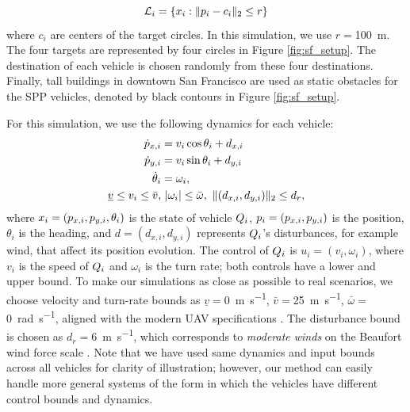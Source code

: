 \begin{equation}
\label{eq:target_sim}
\targetset_i = \{\state_i: \|\pos_i - c_i\|_2 \le r\}
\end{equation}
\noindent where $c_i$ are centers of the target circles. In this simulation, we use $r = $\SI{100}{\m}. The four targets are represented by four circles in Figure \ref{fig:sf_setup}. The destination of each vehicle is chosen randomly from these four destinations. Finally, tall buildings in downtown San Francisco are used as static obstacles for the SPP vehicles, denoted by black contours in Figure \ref{fig:sf_setup}.

For this simulation, we use the following dynamics for each vehicle:
\begin{equation}
\label{eq:dyn_i}
\begin{aligned}
\dot{\pos}_{x,i} &= v_i \cos \theta_i + d_{x,i} \\
\dot{\pos}_{y,i} &= v_i \sin \theta_i + d_{y,i}\\
\dot{\theta}_i &= \omega_i, \\
\underline{v} \le v_i \le \bar{v}, & ~|\omega_i| \le \bar{\omega}, ~\|(d_{x,i}, d_{y,i}) \|_2 \le d_{r},
\end{aligned}
\end{equation}
\noindent where $x_i = (p_{x,i}, p_{y,i}, \theta_i)$ is the state of vehicle $Q_i$, $p_i = (p_{x,i}, p_{y,i})$ is the position, $\theta_i$ is the heading, and $d = (d_{x,i}, d_{y,i})$ represents $Q_i$'s disturbances, for example wind, that affect its position evolution. The control of $Q_i$ is $u_i = (v_i, \omega_i)$, where $v_i$ is the speed of $Q_i$ and $\omega_i$ is the turn rate; both controls have a lower and upper bound. To make our simulations as close as possible to real scenarios, we choose velocity and turn-rate bounds as $\underline{v} = $\SI{0}{\m\per\s}, $\bar{v} = $\SI{25}{\m\per\s}, $\bar\omega = $\SI{0}{\radian\per\s}, aligned with the modern UAV specifications \cite{UAVspecs1, UAVspecs2}. The disturbance bound is chosen as $d_{r} = $\SI{6}{\m\per\s}, which corresponds to \textit{moderate winds} on the Beaufort wind force scale \cite{Windscale}. Note that we have used same dynamics and input bounds across all vehicles for clarity of illustration; however, our method can easily handle more general systems of the form in which the vehicles have different control bounds and dynamics.

